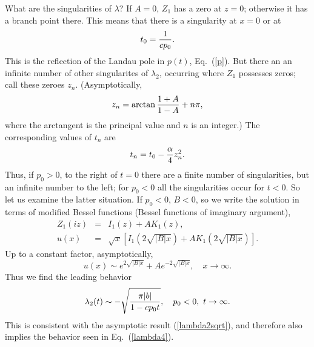 \documentclass[a4paper,aps,prl,preprint,groupedaddress,showpacs,nobibnotes,tightenlines]{revtex4}
\begin{document}
What are the singularities of $\lambda$?  If $A=0$, $Z_1$ has a zero at
$z=0$; otherwise it has a branch point there.  This means that there is
a singularity at $x=0$ or at
\begin{equation}
t_0={1\over cp_0}.
\end{equation}
This is the reflection of the Landau pole in $p(t)$, Eq.~(\ref{p}).
But there an an infinite number of other singularites of $\lambda_2$,
occurring where $Z_1$ possesses zeros; call these zeroes $z_n$.
(Asymptotically,
\begin{equation}
z_n=\arctan{1+A\over1-A}+n\pi,
\end{equation}
where the arctangent is the principal value and $n$ is an integer.)
The corresponding values of $t_n$ are
\begin{equation}
t_n=t_0-{\alpha\over4}z_n^2.
\end{equation}
Thus, if $p_0>0$, to the right of $t=0$ there are a finite number of
singularities, but an infinite number to the left; for $p_0<0$ all the 
singularities occur for $t<0$.  So let us examine the latter situation.
If $p_0<0$, $B<0$, so we write the solution in terms of modified Bessel
functions (Bessel functions of imaginary argument),
\begin{subequations}
\begin{eqnarray}
Z_1(iz)&=&I_1(z)+AK_1(z),\\
u(x)&=&\sqrt{x}\left[I_1\left(2\sqrt{|B|x}\right)+AK_1\left(2\sqrt{|B|x}\right)
\right].
\end{eqnarray}
\end{subequations}
Up to a constant factor, asymptotically,
\begin{equation}
u(x)\sim e^{2\sqrt{|B|x}}+Ae^{-2\sqrt{|B|x}},\quad x\to\infty.
\end{equation}
Thus we find the leading behavior
\begin{equation}
\lambda_2(t)\sim-\sqrt{\pi|b|\over1-cp_0t},\quad p_0<0,\,\,t\to\infty.
\end{equation}
This is consistent with the asymptotic result (\ref{lambda2sqrt}), 
and therefore also implies the behavior seen in Eq.~(\ref{lambda4}).


\end{document}
